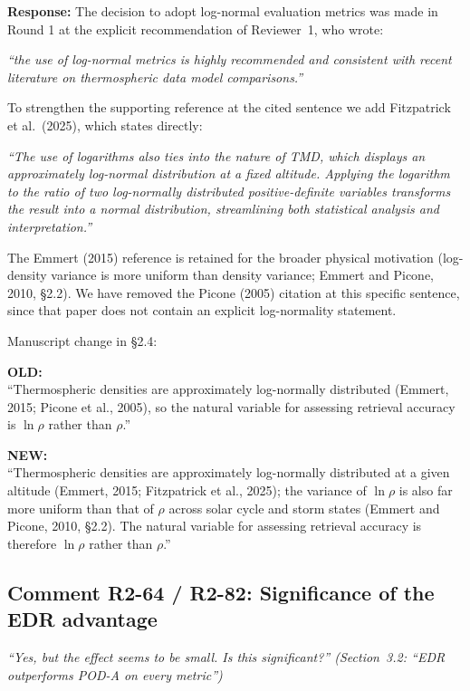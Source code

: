 \documentclass[11pt]{article}
\newcommand{\reviewercomment}[1]{%
  \medskip
  \noindent\textit{\color{reviewblue}#1}%
  \medskip
}
\newcommand{\oldtext}[1]{%
  \smallskip
  \noindent\hspace{1em}\begin{minipage}{0.92\textwidth}%
  \color{quotegray}\textbf{OLD:}\\[2pt]``#1''%
  \end{minipage}%
  \smallskip
}
\newcommand{\newtext}[1]{%
  \smallskip
  \noindent\hspace{1em}\begin{minipage}{0.92\textwidth}%
  \color{quotegreen}\textbf{NEW:}\\[2pt]``#1''%
  \end{minipage}%
  \smallskip
}
\begin{document}
\textbf{Response:}
The decision to adopt log-normal evaluation metrics was made in Round 1 at the explicit recommendation of Reviewer~1, who wrote:

\reviewercomment{``the use of log-normal metrics is highly recommended and consistent with recent literature on thermospheric data model comparisons.''}

To strengthen the supporting reference at the cited sentence we add Fitzpatrick et al.\ (2025), which states directly:

\reviewercomment{``The use of logarithms also ties into the nature of TMD, which displays an approximately log-normal distribution at a fixed altitude. Applying the logarithm to the ratio of two log-normally distributed positive-definite variables transforms the result into a normal distribution, streamlining both statistical analysis and interpretation.''}

\noindent The Emmert (2015) reference is retained for the broader physical motivation (log-density variance is more uniform than density variance; Emmert and Picone, 2010, \S2.2). We have removed the Picone (2005) citation at this specific sentence, since that paper does not contain an explicit log-normality statement.

\medskip
\noindent Manuscript change in \S2.4:

\oldtext{Thermospheric densities are approximately log-normally distributed (Emmert, 2015; Picone et al., 2005), so the natural variable for assessing retrieval accuracy is $\ln \rho$ rather than $\rho$.}

\newtext{Thermospheric densities are approximately log-normally distributed at a given altitude (Emmert, 2015; Fitzpatrick et al., 2025); the variance of $\ln \rho$ is also far more uniform than that of $\rho$ across solar cycle and storm states (Emmert and Picone, 2010, \S2.2). The natural variable for assessing retrieval accuracy is therefore $\ln \rho$ rather than $\rho$.}


\subsection{Comment R2-64 / R2-82: Significance of the EDR advantage}

\reviewercomment{%
``Yes, but the effect seems to be small. Is this significant?''
\;(Section~3.2: ``EDR outperforms POD-A on every metric'')}
\end{document}
